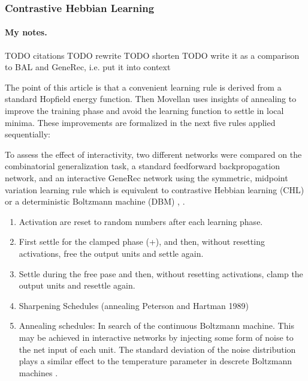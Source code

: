 \subsubsection{Contrastive Hebbian Learning}
\label{models-chl} 

\paragraph{My notes.}
TODO citations 
TODO rewrite 
TODO shorten 
TODO write it as a comparison to BAL and GeneRec, i.e. put it into context 

The point of this article \citet{movellan1990contrastive} is that a convenient learning rule is derived from a standard Hopfield energy function. Then Movellan uses insights of annealing to improve the training phase and avoid the learning function to settle in local minima. These improvements are formalized in the next five rules applied sequentially:

To assess the effect of interactivity, two different networks were compared on the combinatorial generalization task, a standard feedforward backpropagation network, and an interactive GeneRec network using the symmetric, midpoint variation learning rule which is equivalent to contrastive Hebbian learning (CHL) or a deterministic Boltzmann machine (DBM) \citet{o1996bio}, \citet{o2001generalization}. 

\begin{enumerate}
\item Activation are reset to random numbers after each learning phase. 

\item First settle for the clamped phase (+), and then, without resetting activations, free the output units and settle again. 

\item Settle during the free pase and then, without resetting activations, clamp the output units and resettle again. 

\item Sharpening Schedules (annealing Peterson and Hartman 1989)

\item Annealing schedules: In search of the continuous Boltzmann machine. This may be achieved in interactive networks by injecting some form of noise to the net input of each unit. The standard deviation of the noise distribution plays a similar effect to the temperature parameter in descrete Boltzmann machines \citet{movellan1990contrastive}. 
\end{enumerate}


